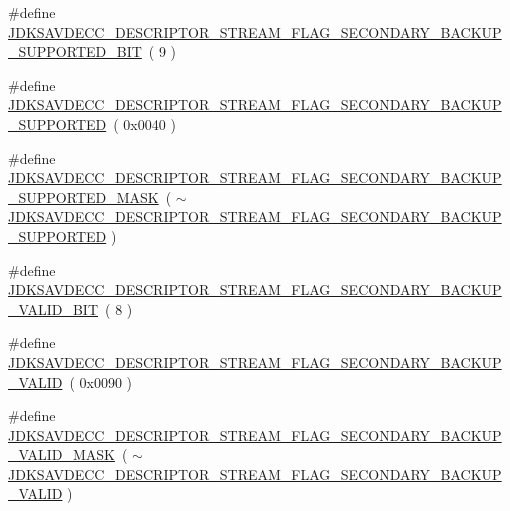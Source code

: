 \begin{DoxyCompactItemize}
\item 
\#define \hyperlink{group__descriptor__stream_gadb3ea495bd6b593f6bcf41dbf1187186}{J\+D\+K\+S\+A\+V\+D\+E\+C\+C\+\_\+\+D\+E\+S\+C\+R\+I\+P\+T\+O\+R\+\_\+\+S\+T\+R\+E\+A\+M\+\_\+\+F\+L\+A\+G\+\_\+\+S\+E\+C\+O\+N\+D\+A\+R\+Y\+\_\+\+B\+A\+C\+K\+U\+P\+\_\+\+S\+U\+P\+P\+O\+R\+T\+E\+D\+\_\+\+B\+IT}~( 9 )
\item 
\#define \hyperlink{group__descriptor__stream_ga827041299f091d6cab8d4e4306ac6710}{J\+D\+K\+S\+A\+V\+D\+E\+C\+C\+\_\+\+D\+E\+S\+C\+R\+I\+P\+T\+O\+R\+\_\+\+S\+T\+R\+E\+A\+M\+\_\+\+F\+L\+A\+G\+\_\+\+S\+E\+C\+O\+N\+D\+A\+R\+Y\+\_\+\+B\+A\+C\+K\+U\+P\+\_\+\+S\+U\+P\+P\+O\+R\+T\+ED}~( 0x0040 )
\item 
\#define \hyperlink{group__descriptor__stream_ga0ca2ec7643bb23e1a101e4829d111ff7}{J\+D\+K\+S\+A\+V\+D\+E\+C\+C\+\_\+\+D\+E\+S\+C\+R\+I\+P\+T\+O\+R\+\_\+\+S\+T\+R\+E\+A\+M\+\_\+\+F\+L\+A\+G\+\_\+\+S\+E\+C\+O\+N\+D\+A\+R\+Y\+\_\+\+B\+A\+C\+K\+U\+P\+\_\+\+S\+U\+P\+P\+O\+R\+T\+E\+D\+\_\+\+M\+A\+SK}~( $\sim$\hyperlink{group__descriptor__stream_ga827041299f091d6cab8d4e4306ac6710}{J\+D\+K\+S\+A\+V\+D\+E\+C\+C\+\_\+\+D\+E\+S\+C\+R\+I\+P\+T\+O\+R\+\_\+\+S\+T\+R\+E\+A\+M\+\_\+\+F\+L\+A\+G\+\_\+\+S\+E\+C\+O\+N\+D\+A\+R\+Y\+\_\+\+B\+A\+C\+K\+U\+P\+\_\+\+S\+U\+P\+P\+O\+R\+T\+ED} )
\item 
\#define \hyperlink{group__descriptor__stream_ga289aacc36db1b4bb2241fe256fb5068f}{J\+D\+K\+S\+A\+V\+D\+E\+C\+C\+\_\+\+D\+E\+S\+C\+R\+I\+P\+T\+O\+R\+\_\+\+S\+T\+R\+E\+A\+M\+\_\+\+F\+L\+A\+G\+\_\+\+S\+E\+C\+O\+N\+D\+A\+R\+Y\+\_\+\+B\+A\+C\+K\+U\+P\+\_\+\+V\+A\+L\+I\+D\+\_\+\+B\+IT}~( 8 )
\item 
\#define \hyperlink{group__descriptor__stream_gabfc9ab0a3a668b23f8f3a0f3c2e0b0a0}{J\+D\+K\+S\+A\+V\+D\+E\+C\+C\+\_\+\+D\+E\+S\+C\+R\+I\+P\+T\+O\+R\+\_\+\+S\+T\+R\+E\+A\+M\+\_\+\+F\+L\+A\+G\+\_\+\+S\+E\+C\+O\+N\+D\+A\+R\+Y\+\_\+\+B\+A\+C\+K\+U\+P\+\_\+\+V\+A\+L\+ID}~( 0x0090 )
\item 
\#define \hyperlink{group__descriptor__stream_ga4585ce35a597538ce37d674834109da5}{J\+D\+K\+S\+A\+V\+D\+E\+C\+C\+\_\+\+D\+E\+S\+C\+R\+I\+P\+T\+O\+R\+\_\+\+S\+T\+R\+E\+A\+M\+\_\+\+F\+L\+A\+G\+\_\+\+S\+E\+C\+O\+N\+D\+A\+R\+Y\+\_\+\+B\+A\+C\+K\+U\+P\+\_\+\+V\+A\+L\+I\+D\+\_\+\+M\+A\+SK}~( $\sim$\hyperlink{group__descriptor__stream_gabfc9ab0a3a668b23f8f3a0f3c2e0b0a0}{J\+D\+K\+S\+A\+V\+D\+E\+C\+C\+\_\+\+D\+E\+S\+C\+R\+I\+P\+T\+O\+R\+\_\+\+S\+T\+R\+E\+A\+M\+\_\+\+F\+L\+A\+G\+\_\+\+S\+E\+C\+O\+N\+D\+A\+R\+Y\+\_\+\+B\+A\+C\+K\+U\+P\+\_\+\+V\+A\+L\+ID} )
\item 

\end{DoxyCompactItemize}

